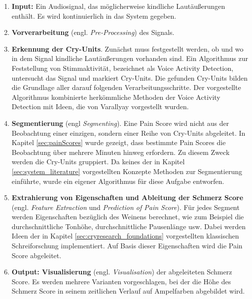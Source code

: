\begin{enumerate}[leftmargin=*]
	\item \textbf{Input: } Ein Audiosignal, das möglicherweise kindliche Lautäußerungen enthält. Es wird kontinuierlich in das System gegeben.
	
	\item \textbf{Vorverarbeitung} (engl. \emph{Pre-Processing}) des Signals.
	
	\item \textbf{Erkennung der Cry-Units}. Zunächst muss festgestellt werden, ob und wo in dem Signal kindliche Lautäußerungen vorhanden sind. Ein Algorithmus zur Feststellung von Stimmaktivität, bezeichnet als Voice Activity Detection, untersucht das Signal und markiert Cry-Units. Die gefunden Cry-Units bilden die Grundlage aller darauf folgenden Verarbeitungsschritte. Der vorgestellte Algorithmus kombinierte herkömmliche Methoden der Voice Activity Detection mit Ideen, die von Varallyay \cite{cry_thesis} vorgestellt wurden.
	
	\item \textbf{Segmentierung} (engl \emph{Segmenting}). Eine Pain Score wird nicht aus der Beobachtung einer einzigen, sondern einer Reihe von Cry-Units abgeleitet. In Kapitel \ref{sec:painScores} wurde gezeigt, dass bestimmte Pain Scores die Beobachtung über mehrere Minuten hinweg erfordern. Zu diesem Zweck werden die Cry-Units gruppiert. Da keines der in Kapitel \ref{sec:system_literature} vorgestellten Konzepte Methoden zur Segmentierung einführte, wurde ein eigener Algorithmus für diese Aufgabe entworfen.
	
	\item \textbf{Extrahierung von Eigenschaften und Ableitung der Schmerz Score} (engl. \emph{Feature Extraction} und \emph{Prediction of Pain Score}). Für jedes Segment werden Eigenschaften bezüglich des Weinens berechnet, wie zum Beispiel die durchschnittliche Tonhöhe, durchschnittliche Pausenlänge usw. Dabei werden Ideen der in Kapitel \ref{sec:cryresearch_foundations} vorgestellten klassischen Schreiforschung implementiert. Auf Basis dieser Eigenschaften wird die Pain Score abgeleitet.
	
	\item \textbf{Output: Visualisierung} (engl. \emph{Visualisation}) der abgeleiteten Schmerz Score. Es werden mehrere Varianten vorgeschlagen, bei der die Höhe des Schmerz Score in seinem zeitlichen Verlauf auf Ampelfarben abgebildet wird.
\end{enumerate}

